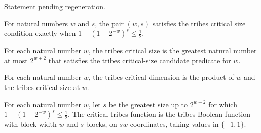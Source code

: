 \begin{theorem}
\label{FABL.tribes_neg_one_probability}
\leanok
{}
Statement pending regeneration.
\end{theorem}

\begin{definition}
\label{FABL.IsTribesCriticalSizeCandidate}
\leanok
For natural numbers $w$ and $s$, the pair $(w,s)$ satisfies the tribes critical size
condition exactly when $1-(1-2^{-w})^s\le \tfrac12$.
\end{definition}

\begin{definition}
\label{FABL.tribesCriticalSize}
\leanok
{}
For each natural number $w$, the tribes critical size is the greatest natural number at
most $2^{w+2}$ that satisfies the tribes critical-size candidate predicate for $w$.
\end{definition}

\begin{definition}
\label{FABL.tribesCriticalDimension}
\leanok
{}
For each natural number $w$, the tribes critical dimension is the product of $w$ and the
tribes critical size at $w$.
\end{definition}

\begin{definition}
\label{FABL.tribesCritical}
\leanok
{}
For each natural number $w$, let $s$ be the greatest size up to $2^{w+2}$ for which
$1-(1-2^{-w})^s\le \tfrac12$. The critical tribes function is the tribes Boolean
function with block width $w$ and $s$ blocks, on $sw$ coordinates, taking values in
$\{−1,1\}$.
\end{definition}

